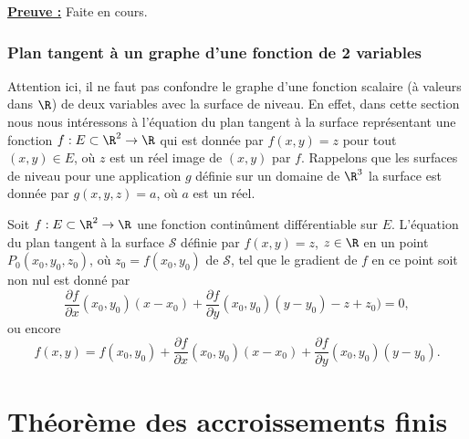 \documentclass[class=report,crop=false]{standalone}
\begin{document}
\noindent \underline{\bf Preuve :}
Faite en cours.

\subsection{Plan tangent à un graphe d'une fonction de 2 variables}
\noindent Attention ici, il ne faut pas confondre le graphe d'une fonction scalaire (à valeurs dans $\R$) de deux variables avec la surface de niveau. En effet, dans cette section nous nous intéressons à l'équation du plan tangent à la surface représentant une fonction $f:  E \subset  \R^2 \rightarrow \R$ qui est donnée par $f(x,y)=z$ pour tout $(x,y) \in E$, où $z$ est un réel image de $(x,y)$ par $f$. Rappelons que les surfaces de niveau pour une application $g$ définie sur un domaine de $\R^3$ la surface est donnée par $g(x,y,z)=a$, où $a$ est un réel. 

 \begin{proposition}
\textcolor[rgb]{0.50,0.00,0.25}{
Soit $f: E \subset  \R^2 \rightarrow \R$ une fonction continûment différentiable sur $E$.
L'équation du plan tangent à la surface  $\mathscr{S}$ définie par $f(x,y)=z$, $z\in \R$  en un point $P_0(x_0,y_0,z_0)$, où $z_0=f(x_0,y_0)$ de $\mathscr{S}$, tel que le gradient de $f$ en ce point soit non nul est donné par
\begin{equation*}
\dfrac{\partial f}{\partial x}(x_0,y_0)(x-x_0)+\dfrac{\partial f}{\partial y}(x_0,y_0)(y-y_0)-z+z_0)=0,
\end{equation*}
ou encore 
 \begin{equation*}
f(x,y)=f(x_0,y_0)+\dfrac{\partial f}{\partial x}(x_0,y_0)(x-x_0)+\dfrac{\partial f}{\partial y}(x_0,y_0)(y-y_0).
\end{equation*}
 }
\end{proposition}

  \chapter{Th\'eor\`eme des accroissements finis}
  
\end{document}
